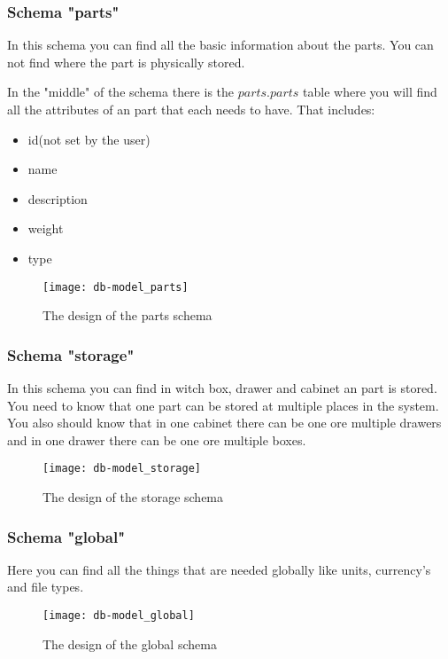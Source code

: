 \newpage
\subsubsection{Schema "parts"}
In this schema you can find all the basic information about the parts. You can not find where the part is physically stored.

In the "middle" of the schema there is the $parts.parts$ table where you will find all the attributes of an part that each needs to have. That includes:
\begin{itemize}
	\item id(not set by the user)
	\item name
	\item description
	\item weight
	\item type
\end{itemize}

\begin{figure}
	\texttt{[image: db-model\_parts]}
	\centering
	\caption{The design of the parts schema}
\end{figure}

\newpage
\subsubsection{Schema "storage"}
In this schema you can find in witch box, drawer and cabinet an part is stored. You need to know that one part can be stored at multiple places in the system. You also should know that in one cabinet there can be one ore multiple drawers and in one drawer there can be one ore multiple boxes.

\begin{figure}
	\texttt{[image: db-model\_storage]}
	\centering
	\caption{The design of the storage schema}
\end{figure}

\newpage
\subsubsection{Schema "global"}
Here you can find all the things that are needed globally like units, currency's and file types.

\begin{figure}[h]
	\texttt{[image: db-model\_global]}
	\centering
	\caption{The design of the global schema}
\end{figure}


